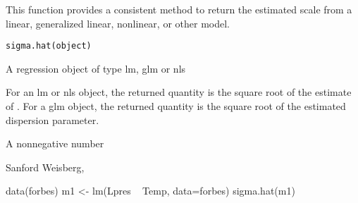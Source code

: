 \begin{Description}\relax
This function provides a consistent method to return the estimated scale
from a linear, generalized linear, nonlinear, or other model.
\end{Description}
\begin{Usage}
\begin{verbatim}
sigma.hat(object)
\end{verbatim}
\end{Usage}
\begin{Arguments}
\begin{ldescription}
\item[\code{object}] A regression object of type lm, glm or nls
\end{ldescription}
\end{Arguments}
\begin{Details}\relax
For an lm or nls object, the returned quantity is the square root of the
estimate of .  For a glm object, the returned quantity is
the square root of the estimated dispersion parameter.
\end{Details}
\begin{Value}
A nonnegative number
\end{Value}
\begin{Author}\relax
Sanford Weisberg, 
\end{Author}
\begin{Examples}
\begin{ExampleCode}
data(forbes)
m1 <- lm(Lpres ~ Temp, data=forbes)
sigma.hat(m1)
\end{ExampleCode}
\end{Examples}

